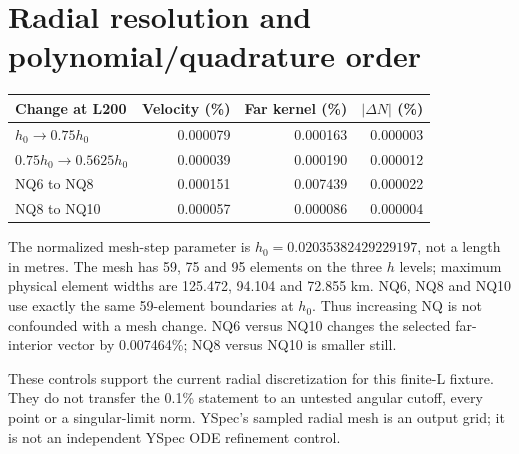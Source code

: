 \documentclass[11pt,a4paper]{article}
\begin{document}
\section{Radial resolution and polynomial/quadrature order}
\begin{center}\small\begin{tabular}{lrrr}\toprule
Change at L200 & Velocity (\%) & Far kernel (\%) & $|\Delta N|$ (\%)\\\midrule
$h_0\to0.75h_0$ & 0.000079 & 0.000163 & 0.000003 \\
$0.75h_0\to0.5625h_0$ & 0.000039 & 0.000190 & 0.000012 \\
NQ6 to NQ8 & 0.000151 & 0.007439 & 0.000022 \\
NQ8 to NQ10 & 0.000057 & 0.000086 & 0.000004 \\
\bottomrule\end{tabular}\end{center}
The normalized mesh-step parameter is $h_0=0.02035382429229197$, not a length in metres. The mesh has 59, 75 and 95 elements on the three $h$ levels; maximum physical element widths are 125.472, 94.104 and 72.855 km. NQ6, NQ8 and NQ10 use exactly the same 59-element boundaries at $h_0$. Thus increasing NQ is not confounded with a mesh change. NQ6 versus NQ10 changes the selected far-interior vector by 0.007464\%; NQ8 versus NQ10 is smaller still.

These controls support the current radial discretization for this finite-L fixture. They do not transfer the 0.1\% statement to an untested angular cutoff, every point or a singular-limit norm. YSpec's sampled radial mesh is an output grid; it is not an independent YSpec ODE refinement control.

\newpage
\end{document}

